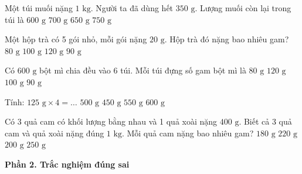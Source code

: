 \begin{ex} %
Một túi muối nặng $1\text{ kg}$. Người ta đã dùng hết $350\text{ g}$. Lượng muối còn lại trong túi là
\choice
{$600\text{ g}$}
{$700\text{ g}$}
{\True $650\text{ g}$}
{$750\text{ g}$}
\end{ex}

\begin{ex} %
Một hộp trà có 5 gói nhỏ, mỗi gói nặng $20\text{ g}$. Hộp trà đó nặng bao nhiêu gam?
\choice
{$80\text{ g}$}
{\True $100\text{ g}$}
{$120\text{ g}$}
{$90\text{ g}$}
\end{ex}

\begin{ex} %
Có $600\text{ g}$ bột mì chia đều vào 6 túi. Mỗi túi đựng số gam bột mì là
\choice
{$80\text{ g}$}
{$120\text{ g}$}
{\True $100\text{ g}$}
{$90\text{ g}$}
\end{ex}

\begin{ex} %
Tính: $125\text{ g} \times 4 = \dots$
\choice
{\True $500\text{ g}$}
{$450\text{ g}$}
{$550\text{ g}$}
{$600\text{ g}$}
\end{ex}

\begin{ex} %
Có 3 quả cam có khối lượng bằng nhau và 1 quả xoài nặng $400\text{ g}$. Biết cả 3 quả cam và quả xoài nặng đúng $1\text{ kg}$. Mỗi quả cam nặng bao nhiêu gam?
\choice
{$180\text{ g}$}
{$220\text{ g}$}
{\True $200\text{ g}$}
{$250\text{ g}$}
\end{ex}

\textbf{Phần 2. Trắc nghiệm đúng sai}


